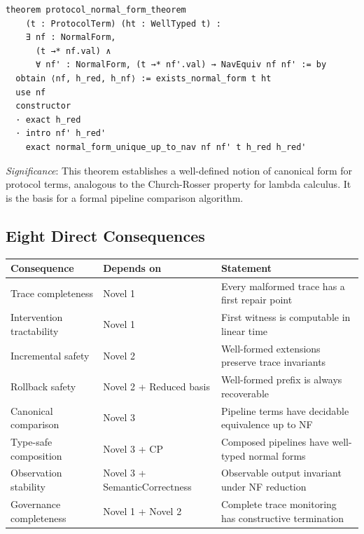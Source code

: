 \begin{lstlisting}
theorem protocol_normal_form_theorem
    (t : ProtocolTerm) (ht : WellTyped t) :
    ∃ nf : NormalForm,
      (t →* nf.val) ∧
      ∀ nf' : NormalForm, (t →* nf'.val) → NavEquiv nf nf' := by
  obtain ⟨nf, h_red, h_nf⟩ := exists_normal_form t ht
  use nf
  constructor
  · exact h_red
  · intro nf' h_red'
    exact normal_form_unique_up_to_nav nf nf' t h_red h_red'
\end{lstlisting}

\textit{Significance}: This theorem establishes a well-defined notion of
canonical form for protocol terms, analogous to the Church-Rosser property for
lambda calculus. It is the basis for a formal pipeline comparison algorithm.

\subsection{Eight Direct Consequences}

\begin{center}
\begin{tabular}{lll}
\toprule
Consequence & Depends on & Statement \\
\midrule
Trace completeness & Novel 1 & Every malformed trace has a first repair point \\
Intervention tractability & Novel 1 & First witness is computable in linear time \\
Incremental safety & Novel 2 & Well-formed extensions preserve trace invariants \\
Rollback safety & Novel 2 + Reduced basis & Well-formed prefix is always recoverable \\
Canonical comparison & Novel 3 & Pipeline terms have decidable equivalence up to NF \\
Type-safe composition & Novel 3 + CP & Composed pipelines have well-typed normal forms \\
Observation stability & Novel 3 + SemanticCorrectness & Observable output invariant under NF reduction \\
Governance completeness & Novel 1 + Novel 2 & Complete trace monitoring has constructive termination \\
\bottomrule
\end{tabular}
\end{center}

